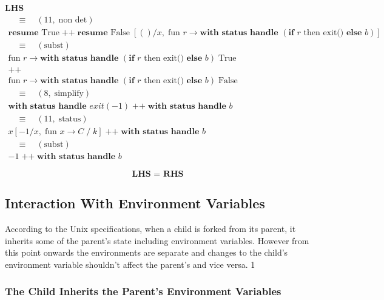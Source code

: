 \documentclass[logo,bsc,singlespacing,parskip]{infthesis}
\begin{document}
\textbf{LHS}
\[
\begin{array}{l}
\quad\equiv\quad (11,\; \text{non det}) \\[5pt]
\textbf{resume } \text{True} \;\texttt{++}\; \textbf{resume } \text{False} \; [()/x,\; \text{fun } r \rightarrow \textbf{with status handle } (\textbf{if } r \text{ then exit()} \textbf{ else } b)] \\[5pt]

\quad\equiv\quad (\text{subst}) \\[5pt]
\text{fun } r \rightarrow \textbf{with status handle } (\textbf{if } r \text{ then exit()} \textbf{ else } b)\; \text{True} \\
\texttt{++} \\
\text{fun } r \rightarrow \textbf{with status handle } (\textbf{if } r \text{ then} \text{ exit()} \textbf{ else } b)\; \text{False} \\[5pt]

\quad\equiv\quad (8,\; \text{simplify}) \\[5pt]
\textbf{with status handle } exit(-1) \;\texttt{++}\; \textbf{with status handle } b \\[5pt]

\quad\equiv\quad (11,\; \text{status}) \\[5pt]
x [-1/x,\; \text{fun } x \rightarrow C \;/\; k] \;\texttt{++}\; \textbf{with status handle } b \\[5pt]

\quad\equiv\quad (\text{subst}) \\[5pt]
-1 \;\texttt{++}\; \textbf{with status handle } b
\end{array}
\]


\[
\textbf{LHS = RHS}
\]


\subsection*{Interaction With Environment Variables}
According to the Unix specifications, when a child is forked from its parent, it inherits some of the parent's state including environment variables. However from this point onwards the environments are separate and changes to the child's environment variable shouldn't affect the parent's and vice versa.
1


\subsubsection*{The Child Inherits the Parent's Environment Variables}
\end{document}
